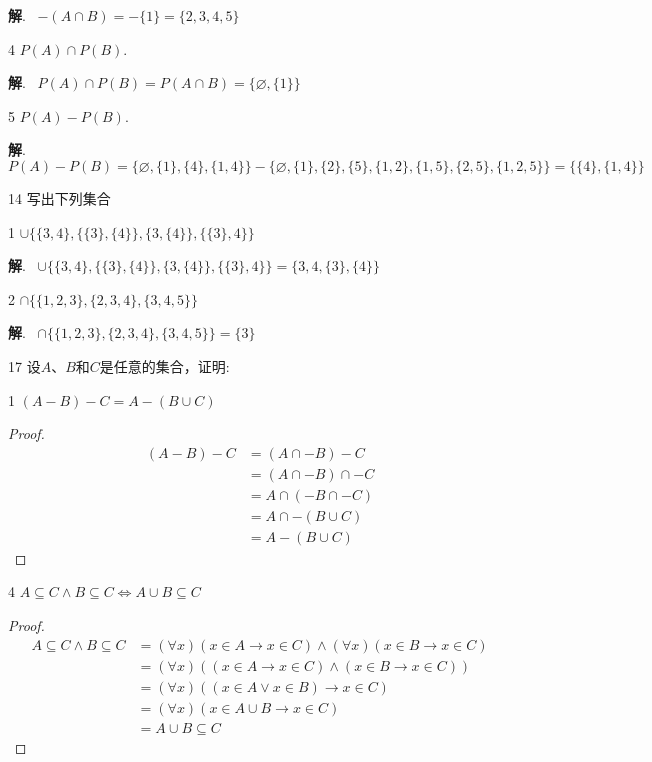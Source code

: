 \documentclass[12pt]{article}
\newenvironment{firstlayer}%
{\begin{list}{}{\renewcommand{\makelabel}[1]{\textbf{##1}.\hfil}
}}
{\end{list}}
\newenvironment{secondlayer}%
{\begin{list}{}{\renewcommand{\makelabel}[1]{(##1)\hfil}
}}
{\end{list}}
\providecommand{\sol}{\textbf{解}.~}
\begin{document}
\begin{CJK}{UTF8}{gbsn}
\begin{firstlayer}
\begin{secondlayer}
\sol
$-(A\cap B)=-\{1\}=\{2,3,4,5\}$

\item[4]$P(A)\cap P(B)$.

\sol
$P(A)\cap P(B)=P(A\cap B)=\{\varnothing,\{1\}\}$

\item[5]$P(A)-P(B)$.

\sol
$P(A)-P(B)=\{\varnothing,\{1\},\{4\},\{1,4\}\}-\{\varnothing,\{1\},\{2\},\{5\},\{1,2\},\{1,5\},\{2,5\},\{1,2,5\}\}=\{\{4\},\{1,4\}\}$

\end{secondlayer}

\item[14] 写出下列集合

\begin{secondlayer}
\item[1]$\cup \{ \{3,4\},\{ \{ 3 \},\{4\} \},\{3,\{4\}\},\{ \{3\},4 \} \}$

\sol
$\cup \{ \{3,4\},\{ \{ 3 \},\{4\} \},\{3,\{4\}\},\{ \{3\},4 \} \}=\{ 3,4,\{3\},\{4\} \}$

\item[2]$\cap \{ \{1,2,3\},\{2,3,4\},\{3,4,5\} \}$

\sol
$\cap \{ \{1,2,3\},\{2,3,4\},\{3,4,5\} \}=\{3\}$
\end{secondlayer}

\item[17] 设$A$、$B$和$C$是任意的集合，证明:

\begin{secondlayer}
\item[1] $(A-B)-C=A-(B\cup C)$

\begin{proof}
\begin{align*}
  (A-B)-C&=(A\cap -B)-C\\&=(A\cap -B) \cap -C\\&=A\cap(-B\cap -C)\\&=A\cap - (B\cup C)\\&=A-(B\cup C)
\end{align*}
\end{proof}

\item[4] $A\subseteq C\wedge B\subseteq C\Leftrightarrow A\cup B\subseteq C$

\begin{proof}
\begin{align*}
  A\subseteq C\wedge B\subseteq C&=(\forall x)(x\in A\rightarrow x\in C)\wedge(\forall x)(x\in B\rightarrow x\in C)\\
  &=(\forall x)((x\in A\rightarrow x\in C)\wedge(x\in B\rightarrow x\in C))\\
  &=(\forall x)((x\in A \vee x\in B)\rightarrow x\in C)\\
  &=(\forall x)(x\in A \cup B\rightarrow x\in C)\\
  &=A\cup B\subseteq C
\end{align*}


\end{proof}
\end{secondlayer}
\end{firstlayer}
\end{CJK}
\end{document}
